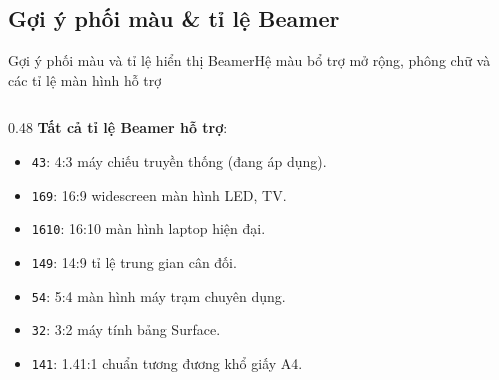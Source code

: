 \documentclass[aspectratio=43,10pt]{beamer}
\begin{document}
\subsection{Gợi ý phối màu \& tỉ lệ Beamer}
\begin{frame}{Gợi ý phối màu và tỉ lệ hiển thị Beamer}{Hệ màu bổ trợ mở rộng, phông chữ và các tỉ lệ màn hình hỗ trợ}
  \footnotesize
  \begin{columns}[T]

    \begin{column}{0.48\textwidth}
      \textbf{Tất cả tỉ lệ Beamer hỗ trợ}:
      \begin{itemize}\setlength{\itemsep}{1pt}
        \item \texttt{43}: 4:3 máy chiếu truyền thống (đang áp dụng).
        \item \texttt{169}: 16:9 widescreen màn hình LED, TV.
        \item \texttt{1610}: 16:10 màn hình laptop hiện đại.
        \item \texttt{149}: 14:9 tỉ lệ trung gian cân đối.
        \item \texttt{54}: 5:4 màn hình máy trạm chuyên dụng.
        \item \texttt{32}: 3:2 máy tính bảng Surface.
        \item \texttt{141}: 1.41:1 chuẩn tương đương khổ giấy A4.
      \end{itemize}
    \end{column}
  \end{columns}
\end{frame}
\end{document}
